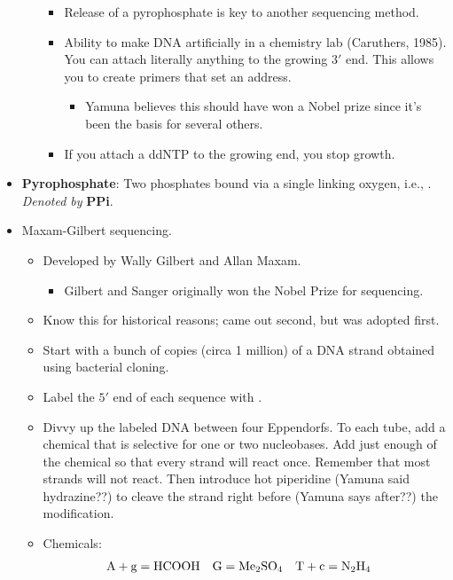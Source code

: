 \documentclass[../notes.tex]{subfiles}
\begin{document}
\begin{itemize}
\begin{itemize}
\begin{itemize}
            \item Release of a pyrophosphate is key to another sequencing method.
            \item Ability to make DNA artificially in a chemistry lab (Caruthers, 1985). You can attach literally anything to the growing $3'$ end. This allows you to create primers that set an address.
            \begin{itemize}
                \item Yamuna believes this should have won a Nobel prize since it's been the basis for several others.
            \end{itemize}
            \item If you attach a ddNTP to the growing end, you stop growth.
        \end{itemize}
    \end{itemize}
    \item \textbf{Pyrophosphate}: Two phosphates bound via a single linking oxygen, i.e., . \emph{Denoted by} \textbf{PPi}.
    \item Maxam-Gilbert sequencing.
    \begin{itemize}
        \item Developed by Wally Gilbert and Allan Maxam.
        \begin{itemize}
            \item Gilbert and Sanger originally won the Nobel Prize for sequencing.
        \end{itemize}
        \item Know this for historical reasons; came out second, but was adopted first.
        \item Start with a bunch of copies (circa 1 million) of a DNA strand obtained using bacterial cloning.
        \item Label the $5'$ end of each sequence with .
        \item Divvy up the labeled DNA between four Eppendorfs. To each tube, add a chemical that is selective for one or two nucleobases. Add just enough of the chemical so that every strand will react once. Remember that most strands will not react. Then introduce hot piperidine (Yamuna said hydrazine??) to cleave the strand right before (Yamuna says after??) the modification.
        \item Chemicals:
        \begin{align*}
            \text{A}+\text{g} &= \ce{HCOOH}&
            \text{G} &= \ce{Me2SO4}&
            \text{T}+\text{c} &= \ce{N2H4}&

\end{align*}
\end{itemize}
\end{itemize}
\end{document}
